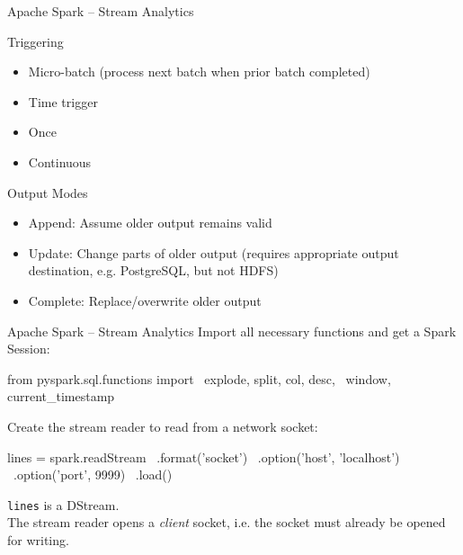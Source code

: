 \documentclass[ignorenonframetext,xcolor=x11names]{beamer}
\begin{document}
\begin{frame}{Apache Spark -- Stream Analytics}
\begin{block}{Triggering}
\begin{itemize}
   \item Micro-batch (process next batch when prior batch completed)
   \item Time trigger
   \item Once
   \item Continuous
\end{itemize}
\end{block}
\begin{block}{Output Modes}
\begin{itemize}
   \item Append: Assume older output remains valid
   \item Update: Change parts of older output (requires appropriate output destination, e.g. PostgreSQL, but not HDFS)
   \item Complete: Replace/overwrite older output
\end{itemize}
\end{block}
\end{frame}



\begin{frame}[fragile]{Apache Spark -- Stream Analytics}
Import all necessary functions and get a Spark Session:
\begin{pythoncode}
from pyspark.sql.functions import \
    explode, split, col, desc, \
    window, current_timestamp
\end{pythoncode}
Create the stream reader to read from a network socket:
\begin{pythoncode}
lines = spark.readStream \
             .format('socket') \
             .option('host', 'localhost') \
             .option('port', 9999) \
             .load()
\end{pythoncode}
\texttt{lines} is a DStream. \\

The stream reader opens a \emph{client} socket, i.e. the socket must already be opened for writing.
\end{frame}
\end{document}
